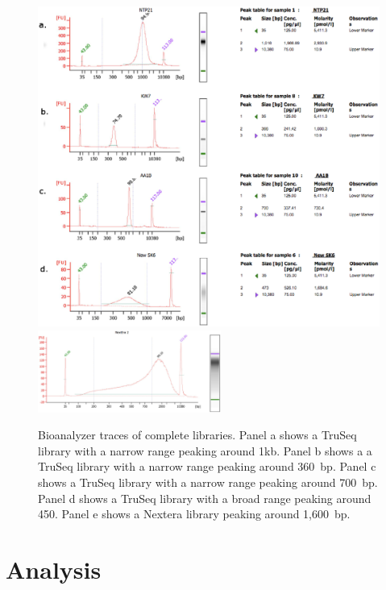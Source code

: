 \documentclass[graybox]{svmult}
\begin{document}
\begin{figure}
\caption{Bioanalyzer traces of complete libraries. Panel a shows a TruSeq library with a narrow range peaking around 1kb. Panel b shows a a TruSeq library with a narrow range peaking around 360~bp. Panel c shows a TruSeq library with a narrow range peaking around 700~bp. Panel d shows a TruSeq library with a broad range peaking around 450. Panel e shows a Nextera library peaking around 1,600~bp.  }
\includegraphics[width=12cm]{imgs/ABCD.eps}
\includegraphics[width=6cm]{imgs/image6.eps}
%
\label{fig:2}       %
\end{figure}

\section{Analysis}
\label{sec:4}
\end{document}
